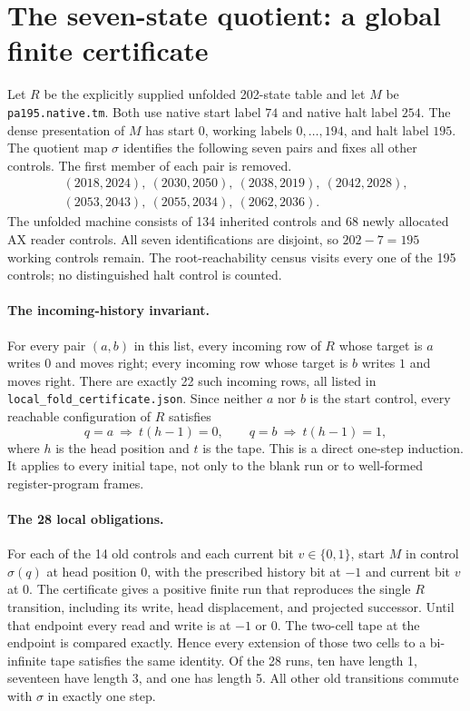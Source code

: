 \section{The seven-state quotient: a global finite certificate}

Let $R$ be the explicitly supplied unfolded 202-state table and let $M$
be \texttt{pa195.native.tm}.  Both use native start label $74$ and native
halt label $254$.  The dense presentation of $M$ has start $0$, working
labels $0,\ldots,194$, and halt label $195$.
The quotient map $\sigma$ identifies the following seven pairs and fixes
all other controls.  The first member of each pair is removed.
\[
\begin{gathered}
(2018,2024),\ (2030,2050),\ (2038,2019),\ (2042,2028),\\
(2053,2043),\ (2055,2034),\ (2062,2036).
\end{gathered}
\]
The unfolded machine consists of 134 inherited controls and 68 newly
allocated AX reader controls.  All seven identifications are disjoint, so
$202-7=195$ working controls remain.  The root-reachability census visits
every one of the 195 controls; no distinguished halt control is counted.

\paragraph{The incoming-history invariant.}
For every pair $(a,b)$ in this list, every incoming row of $R$ whose target
is $a$ writes $0$ and moves right; every incoming row whose target is $b$
writes $1$ and moves right.  There are exactly 22 such incoming rows, all
listed in \texttt{local\_fold\_certificate.json}.  Since neither $a$ nor
$b$ is the start control, every reachable configuration of $R$ satisfies
\[
 q=a\ \Longrightarrow\ t(h-1)=0,
 \qquad
 q=b\ \Longrightarrow\ t(h-1)=1,
\]
where $h$ is the head position and $t$ is the tape.  This is a direct
one-step induction.  It applies to every initial tape, not only to the
blank run or to well-formed register-program frames.

\paragraph{The 28 local obligations.}
For each of the 14 old controls and each current bit $v\in\{0,1\}$,
start $M$ in control $\sigma(q)$ at head position $0$, with the prescribed
history bit at $-1$ and current bit $v$ at $0$.
The certificate gives a positive finite run that reproduces the single
$R$ transition, including its write, head displacement, and projected
successor.  Until that endpoint every read and write is at $-1$ or $0$.
The two-cell tape at the endpoint is compared exactly.  Hence every
extension of those two cells to a bi-infinite tape satisfies the same
identity.  Of the 28 runs, ten have length 1, seventeen have length 3,
and one has length 5.  All other old transitions commute with $\sigma$
in exactly one step.

